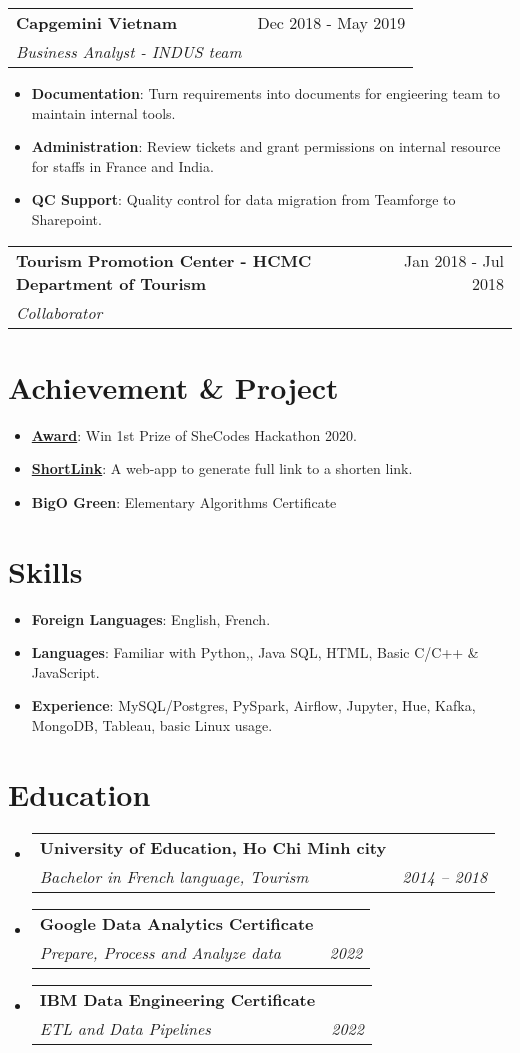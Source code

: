 \documentclass[letterpaper,11pt]{article}
\makeatletter
\newcommand{\resumeItem}[2]{
  \item\small{
    \textbf{#1}{: #2 \vspace{-2pt}}
  }
}
\newcommand{\resumeSubheading}[4]{
  \vspace{-1pt}
  \item
    \begin{tabular*}{0.97\textwidth}{l@{\extracolsep{\fill}}r}
      \textbf{#1} & #2 \\
      \textit{\small#3} & \textit{\small #4} \\
    \end{tabular*}\vspace{-5pt}
}
\newcommand{\resumeSubItem}[2]{\resumeItem{#1}{#2}\vspace{-4pt}}
\newcommand{\resumeSubHeadingListStart}{\begin{itemize}[leftmargin=*]}
\newcommand{\resumeSubHeadingListEnd}{\end{itemize}}
\newcommand{\resumeItemListStart}{\begin{itemize}}
\newcommand{\resumeItemListEnd}{\end{itemize}\vspace{-5pt}}
\makeatother
\begin{document}
    \resumeSubheading
      {Capgemini Vietnam}{Dec 2018 - May 2019}
      {Business Analyst - INDUS team}{}
      \resumeItemListStart
        \resumeItem{Documentation}
          {Turn requirements into documents for engieering team to maintain internal tools.} 
        \resumeItem{Administration}
            {Review tickets and grant permissions on internal resource for staffs in France and India.}
        \resumeItem{QC Support}    
            {Quality control for data migration from Teamforge to Sharepoint. }
      \resumeItemListEnd


    \resumeSubheading
      {Tourism Promotion Center - HCMC Department of Tourism}{Jan 2018 - Jul 2018}
      {Collaborator}
\resumeSubHeadingListEnd
  
  
\section{Achievement \& Project}
  \resumeSubHeadingListStart 
    \resumeSubItem{\href{}{Award}}
      {Win 1st Prize of SheCodes Hackathon 2020. }
    \resumeSubItem{\href{https://github.com/tuyen-nnt/shortenLink}{ShortLink}}
      {A web-app to generate full link to a shorten link.}
    \resumeSubItem{BigO Green}
      {Elementary Algorithms Certificate}
\resumeSubHeadingListEnd


\section{Skills}
  \resumeSubHeadingListStart
    \resumeSubItem{Foreign Languages}
      {English, French.}
    \resumeSubItem{Languages}
      {Familiar with Python,, Java SQL, HTML, Basic C/C++ & JavaScript.}
    \resumeSubItem{Experience}
      {MySQL/Postgres, PySpark, Airflow, Jupyter, Hue, Kafka, MongoDB, Tableau, basic Linux usage.}
\resumeSubHeadingListEnd

\section{Education}
  \resumeSubHeadingListStart
    \resumeSubheading
      {University of Education, Ho Chi Minh city}{}
      {Bachelor in French language, Tourism}{2014 -- 2018}
    \resumeSubheading
      {Google Data Analytics Certificate}{}
      {Prepare, Process and Analyze data}{2022}%
    \resumeSubheading
      {IBM Data Engineering Certificate}{}  
      {ETL and Data Pipelines}{2022}%
  \resumeSubHeadingListEnd
\end{document}
